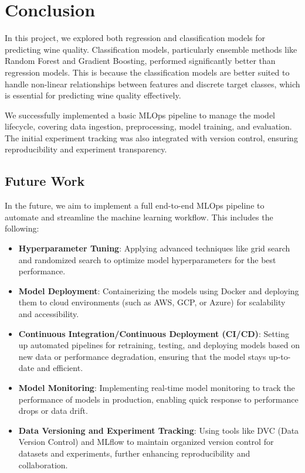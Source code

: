\documentclass[10pt,twocolumn,letterpaper]{article}
\begin{document}
\section{Conclusion}
In this project, we explored both regression and classification models for predicting wine quality. Classification models, particularly ensemble methods like Random Forest and Gradient Boosting, performed significantly better than regression models. This is because the classification models are better suited to handle non-linear relationships between features and discrete target classes, which is essential for predicting wine quality effectively. 

We successfully implemented a basic MLOps pipeline to manage the model lifecycle, covering data ingestion, preprocessing, model training, and evaluation. The initial experiment tracking was also integrated with version control, ensuring reproducibility and experiment transparency.

\subsection{Future Work}
In the future, we aim to implement a full end-to-end MLOps pipeline to automate and streamline the machine learning workflow. This includes the following:

\begin{itemize}
    \item \textbf{Hyperparameter Tuning}: Applying advanced techniques like grid search and randomized search to optimize model hyperparameters for the best performance.
    \item \textbf{Model Deployment}: Containerizing the models using Docker and deploying them to cloud environments (such as AWS, GCP, or Azure) for scalability and accessibility.
    \item \textbf{Continuous Integration/Continuous Deployment (CI/CD)}: Setting up automated pipelines for retraining, testing, and deploying models based on new data or performance degradation, ensuring that the model stays up-to-date and efficient.
    \item \textbf{Model Monitoring}: Implementing real-time model monitoring to track the performance of models in production, enabling quick response to performance drops or data drift.
    \item \textbf{Data Versioning and Experiment Tracking}: Using tools like DVC (Data Version Control) and MLflow to maintain organized version control for datasets and experiments, further enhancing reproducibility and collaboration.
\end{itemize}
\end{document}
